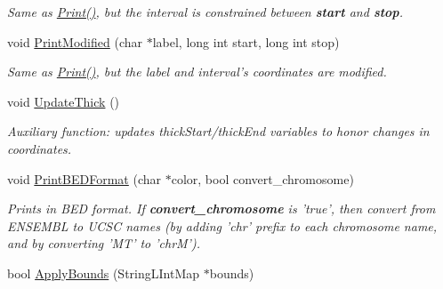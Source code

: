 \begin{CompactItemize}
\begin{CompactList}\small\item\em Same as \hyperlink{classGenomicRegionBED_ffbd8eb279f10f9b45189e2388fe7e89}{Print()}, but the interval is constrained between {\bf start} and {\bf stop}. \item\end{CompactList}\item 
\hypertarget{classGenomicRegionBED_aebba3c31c0fa88e594706f490030549}{
void \hyperlink{classGenomicRegionBED_aebba3c31c0fa88e594706f490030549}{PrintModified} (char $\ast$label, long int start, long int stop)}
\label{classGenomicRegionBED_aebba3c31c0fa88e594706f490030549}

\begin{CompactList}\small\item\em Same as \hyperlink{classGenomicRegionBED_ffbd8eb279f10f9b45189e2388fe7e89}{Print()}, but the label and interval's coordinates are modified. \item\end{CompactList}\item 
\hypertarget{classGenomicRegionBED_01bd886cfa67a3adae10c67dee941924}{
void \hyperlink{classGenomicRegionBED_01bd886cfa67a3adae10c67dee941924}{UpdateThick} ()}
\label{classGenomicRegionBED_01bd886cfa67a3adae10c67dee941924}

\begin{CompactList}\small\item\em Auxiliary function: updates thickStart/thickEnd variables to honor changes in coordinates. \item\end{CompactList}\item 
\hypertarget{classGenomicRegionBED_513fb071e2626be58837052daf86bab5}{
void \hyperlink{classGenomicRegionBED_513fb071e2626be58837052daf86bab5}{PrintBEDFormat} (char $\ast$color, bool convert\_\-chromosome)}
\label{classGenomicRegionBED_513fb071e2626be58837052daf86bab5}

\begin{CompactList}\small\item\em Prints in BED format. If {\bf convert\_\-chromosome} is 'true', then convert from ENSEMBL to UCSC names (by adding 'chr' prefix to each chromosome name, and by converting 'MT' to 'chrM'). \item\end{CompactList}\item 
\hypertarget{classGenomicRegionBED_d9ec9c8dd69ee078fde940463ad46e1e}{
bool \hyperlink{classGenomicRegionBED_d9ec9c8dd69ee078fde940463ad46e1e}{ApplyBounds} (StringLIntMap $\ast$bounds)}
\label{classGenomicRegionBED_d9ec9c8dd69ee078fde940463ad46e1e}


\end{CompactItemize}
